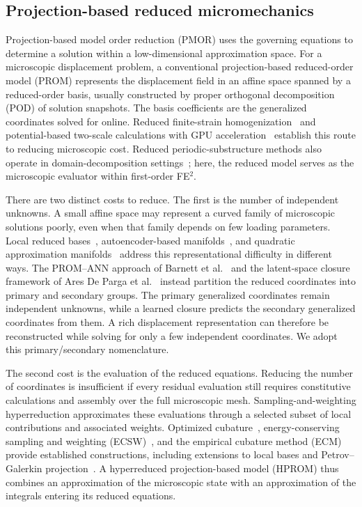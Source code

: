 \subsection{Projection-based reduced micromechanics}
Projection-based model order reduction (PMOR) uses the governing equations to determine a solution within a low-dimensional approximation space. For a microscopic displacement problem, a conventional projection-based reduced-order model (PROM) represents the displacement field in an affine space spanned by a reduced-order basis, usually constructed by proper orthogonal decomposition (POD) of solution snapshots. The basis coefficients are the generalized coordinates solved for online. Reduced finite-strain homogenization~\cite{yvonnet2007,Hernandez2014} and potential-based two-scale calculations with GPU acceleration~\cite{Fritzen2016} establish this route to reducing microscopic cost. Reduced periodic-substructure methods also operate in domain-decomposition settings~\cite{Hernandez2020}; here, the reduced model serves as the microscopic evaluator within first-order FE$^2$.

There are two distinct costs to reduce. The first is the number of independent unknowns. A small affine space may represent a curved family of microscopic solutions poorly, even when that family depends on few loading parameters. Local reduced bases~\cite{Amsallem2012}, autoencoder-based manifolds~\cite{Lee2020}, and quadratic approximation manifolds~\cite{Barnett2022} address this representational difficulty in different ways. The PROM--ANN approach of Barnett et al.~\cite{barnett2023} and the latent-space closure framework of Ares De Parga et al.~\cite{aresdeparga2026nonlinear} instead partition the reduced coordinates into primary and secondary groups. The primary generalized coordinates remain independent unknowns, while a learned closure predicts the secondary generalized coordinates from them. A rich displacement representation can therefore be reconstructed while solving for only a few independent coordinates. We adopt this primary/secondary nomenclature.

The second cost is the evaluation of the reduced equations. Reducing the number of coordinates is insufficient if every residual evaluation still requires constitutive calculations and assembly over the full microscopic mesh. Sampling-and-weighting hyperreduction approximates these evaluations through a selected subset of local contributions and associated weights. Optimized cubature~\cite{An2008}, energy-conserving sampling and weighting (ECSW)~\cite{Farhat2014,farhat2015}, and the empirical cubature method (ECM)~\cite{hernandez2017} provide established constructions, including extensions to local bases and Petrov--Galerkin projection~\cite{Grimberg2021,AresDeParga2023}. A hyperreduced projection-based model (HPROM) thus combines an approximation of the microscopic state with an approximation of the integrals entering its reduced equations.

